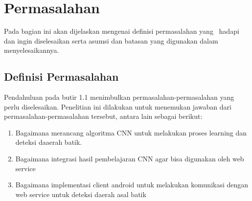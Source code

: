 \section{Permasalahan}
Pada bagian ini akan dijelaskan mengenai definisi permasalahan 
yang \saya~hadapi dan ingin diselesaikan serta asumsi dan batasan 
yang digunakan dalam menyelesaikannya.


\subsection{Definisi Permasalahan}
Pendahuluan pada butir 1.1 menimbulkan permasalahan-permasalahan yang perlu diselesaikan. Penelitian ini dilakukan untuk menemukan jawaban dari permasalahan-permasalahan tersebut, antara lain sebagai berikut:
\begin{enumerate}
	\item Bagaimana merancang algoritma CNN untuk melakukan proses learning dan deteksi daaerah batik.
	\item Bagaimana integrasi hasil pembelajaran CNN agar bisa digunakan oleh web service
	\item Bagaimana implementasi client android untuk melakukan komunikasi dengan web service untuk deteksi daerah asal batik
\end{enumerate}

